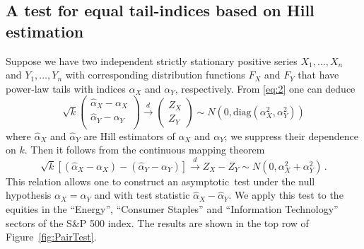\documentclass[11pt,a4]{amsart}
\newcommand{\asy}{asymptotic}
\newcommand{\df}{distribution function}
\newcommand{\1}{{\mathbf 1}}
\begin{document}
\subsection{A test for equal tail-indices based on Hill estimation}
Suppose we have two independent strictly stationary positive series $X_1, \dots, X_n $ and
$Y_1, \dots, Y_n$ with corresponding \df s $F_X$ and $F_Y$ that have power-law tails
with indices $\alpha_X$ and $\alpha_Y$, respectively. 
From \eqref{eq:2} one can deduce
\begin{equation}
  \label{eq:x3}
  \sqrt k
  \begin{pmatrix}
    {\hat \alpha_X - \alpha_X} \\
    {\hat \alpha_Y - \alpha_Y} \\
  \end{pmatrix} \overset{d}{\to}
  \begin{pmatrix}
    Z_X \\
    Z_Y
  \end{pmatrix}
  \sim
  N\left(
    0, \text{diag}(\alpha_X^2, \alpha_Y^2)
  \right)
\end{equation}
where $\hat \alpha_X$ and $\hat \alpha_Y$ are Hill estimators of
$\alpha_X$ and $\alpha_Y$; we suppress their dependence on $k$. Then it follows from the continuous mapping
theorem
\begin{equation}
  \label{eq:x1}
  \sqrt k [(\hat \alpha_X -\alpha_X) - (\hat \alpha_Y - \alpha_Y)]
  \overset{d}{\to}
  Z_X - Z_Y \sim N(0, \alpha_X^2 + \alpha_Y^2)\,.
\end{equation}
This relation allows one to construct an \asy\ test under 
the null hypothesis $\alpha_X = \alpha_Y$ and with test statistic $\hat \alpha_X - \hat \alpha_Y$.
We apply this test to the equities in the ``Energy'',
``Consumer Staples'' and ``Information Technology''
sectors of the S\&P 500 index. The results are shown in the top row of
Figure~\ref{fig:PairTest}.
\end{document}
